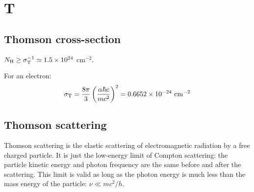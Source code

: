 \documentclass[11pt]{article}
\begin{document}
\section{T} 
\subsection{Thomson cross-section}
$N_{\rm H} \geq \sigma_{\rm T}^{-1} \simeq 1.5 \times 10^{24}$ cm$^{-2}$. 

For an electron:
\begin{equation}
\sigma_{\rm T}= \frac{8\pi}{3} \left(\frac{\alpha\hbar c}{mc^2}\right)^2 = 0.6652\times10^{-24} \,\, \rm{cm}^{-2}
\end{equation}

\subsection{Thomson scattering} 
Thomson scattering is the elastic scattering of electromagnetic radiation by a free charged particle. It is just the low-energy limit of Compton scattering: the particle kinetic energy and photon frequency are the same before and after the scattering. This limit is valid as long as the photon energy is much less than the mass energy of the particle: $\nu\ll mc^2/h$.



\end{document}
